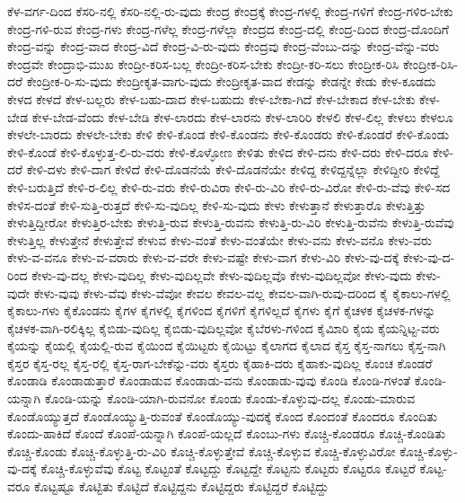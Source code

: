 {ಕೆಳ-ವರ್ಗ-ದಿಂದ
ಕೆಸರಿ-ನಲ್ಲಿ
ಕೆಸರಿ-ನಲ್ಲಿ-ರು-ವುದು
ಕೇಂದ್ರ
ಕೇಂದ್ರಕ್ಕೆ
ಕೇಂದ್ರ-ಗಳಲ್ಲಿ
ಕೇಂದ್ರ-ಗಳಿಗೆ
ಕೇಂದ್ರ-ಗಳಿರ-ಬೇಕು
ಕೇಂದ್ರ-ಗಳಿ-ರುವ
ಕೇಂದ್ರ-ಗಳು
ಕೇಂದ್ರ-ಗಳೆಲ್ಲ
ಕೇಂದ್ರ-ಗಳೆಲ್ಲಾ
ಕೇಂದ್ರದ
ಕೇಂದ್ರ-ದಲ್ಲಿ
ಕೇಂದ್ರ-ದಿಂದ
ಕೇಂದ್ರ-ದೊಂದಿಗೆ
ಕೇಂದ್ರ-ವನ್ನು
ಕೇಂದ್ರ-ವಾದ
ಕೇಂದ್ರ-ವಿದೆ
ಕೇಂದ್ರ-ವಿ-ರು-ವುದು
ಕೇಂದ್ರವು
ಕೇಂದ್ರ-ವೆಂಬು-ದನ್ನು
ಕೇಂದ್ರ-ವೆನ್ನು-ವರು
ಕೇಂದ್ರವೇ
ಕೇಂದ್ರಾಭಿ-ಮುಖ
ಕೇಂದ್ರೀ-ಕರಿಸ-ಬಲ್ಲ
ಕೇಂದ್ರೀ-ಕರಿಸ-ಬೇಕು
ಕೇಂದ್ರೀ-ಕರಿ-ಸಲು
ಕೇಂದ್ರೀಕ-ರಿಸಿ
ಕೇಂದ್ರೀಕ-ರಿಸಿ-ದರೆ
ಕೇಂದ್ರೀಕ-ರಿ-ಸು-ವುದು
ಕೇಂದ್ರೀಕೃತ-ವಾಗು-ವುದು
ಕೇಂದ್ರೀಕೃತ-ವಾದ
ಕೇಡನ್ನು
ಕೇಡನ್ನೇ
ಕೇಡು
ಕೇಳ-ಕೂಡದು
ಕೇಳದ
ಕೇಳದೆ
ಕೇಳ-ಬಲ್ಲರು
ಕೇಳ-ಬಹು-ದಾದ
ಕೇಳ-ಬಹುದು
ಕೇಳ-ಬೇಕಾ-ಗಿದೆ
ಕೇಳ-ಬೇಕಾದ
ಕೇಳ-ಬೇಕು
ಕೇಳ-ಬೇಡ
ಕೇಳ-ಬೇಡ-ವೆಂದು
ಕೇಳ-ಬೇಡಿ
ಕೇಳ-ಲಾರದು
ಕೇಳ-ಲಾರನು
ಕೇಳ-ಲಾರಿರಿ
ಕೇಳಲಿ
ಕೇಳ-ಲಿಲ್ಲ
ಕೇಳಲು
ಕೇಳಲೂ
ಕೇಳಲೇ-ಬಾರದು
ಕೇಳಲೇ-ಬೇಕು
ಕೇಳಿ
ಕೇಳಿ-ಕೊಂಡ
ಕೇಳಿ-ಕೊಂಡನು
ಕೇಳಿ-ಕೊಂಡರು
ಕೇಳಿ-ಕೊಂಡರೆ
ಕೇಳಿ-ಕೊಂಡು
ಕೇಳಿ-ಕೊಂಡೆ
ಕೇಳಿ-ಕೊಳ್ಳುತ್ತ-ಲಿ-ರು-ವರು
ಕೇಳಿ-ಕೊಳ್ಳೋಣ
ಕೇಳಿತು
ಕೇಳಿದ
ಕೇಳಿ-ದನು
ಕೇಳಿ-ದರು
ಕೇಳಿ-ದರೂ
ಕೇಳಿ-ದರೆ
ಕೇಳಿ-ದಳು
ಕೇಳಿ-ದಾಗ
ಕೇಳಿದೆ
ಕೇಳಿ-ದೊಡನೆಯೆ
ಕೇಳಿ-ದೊಡನೆಯೇ
ಕೇಳಿದ್ದ
ಕೇಳಿದ್ದನ್ನೆಲ್ಲಾ
ಕೇಳಿದ್ದೀರಿ
ಕೇಳಿದ್ದೆ
ಕೇಳಿ-ಬರುತ್ತಿದೆ
ಕೇಳಿ-ರ-ಲಿಲ್ಲ
ಕೇಳಿ-ರು-ವರು
ಕೇಳಿ-ರುವಿರಾ
ಕೇಳಿ-ರು-ವಿರಿ
ಕೇಳಿ-ರು-ವಿರೋ
ಕೇಳಿ-ರು-ವೆವು
ಕೇಳಿ-ಸದ
ಕೇಳಿಸ-ದಂತೆ
ಕೇಳಿ-ಸುತ್ತಿ-ರುತ್ತದೆ
ಕೇಳಿ-ಸು-ವುದಿಲ್ಲ
ಕೇಳಿ-ಸು-ವುದು
ಕೇಳು
ಕೇಳುತ್ತಾನೆ
ಕೇಳುತ್ತಾರೊ
ಕೇಳುತ್ತಿತ್ತು
ಕೇಳುತ್ತಿದ್ದೀರೋ
ಕೇಳುತ್ತಿರ-ಬೇಕು
ಕೇಳುತ್ತಿ-ರುವ
ಕೇಳುತ್ತಿ-ರುವನು
ಕೇಳುತ್ತಿ-ರು-ವಿರಿ
ಕೇಳುತ್ತಿ-ರುವೆನು
ಕೇಳುತ್ತಿ-ರುವೆವು
ಕೇಳುತ್ತಿಲ್ಲ
ಕೇಳುತ್ತೇನೆ
ಕೇಳುತ್ತೇವೆ
ಕೇಳುವ
ಕೇಳು-ವಂತೆ
ಕೇಳು-ವಂತೆಯೇ
ಕೇಳು-ವನು
ಕೇಳು-ವನೊ
ಕೇಳು-ವರು
ಕೇಳು-ವ-ವನೂ
ಕೇಳು-ವ-ವರಾರು
ಕೇಳು-ವ-ವರೇ
ಕೇಳು-ವಷ್ಟೇ
ಕೇಳು-ವಾಗ
ಕೇಳು-ವಿರಿ
ಕೇಳು-ವು-ದಕ್ಕೆ
ಕೇಳು-ವು-ದ-ರಿಂದ
ಕೇಳು-ವು-ದಲ್ಲ
ಕೇಳು-ವುದಿಲ್ಲ
ಕೇಳು-ವುದಿಲ್ಲವೇ
ಕೇಳು-ವುದಿಲ್ಲವೊ
ಕೇಳು-ವುದಿಲ್ಲವೋ
ಕೇಳು-ವುದು
ಕೇಳು-ವುದೇ
ಕೇಳು-ವುವು
ಕೇಳು-ವೆವು
ಕೇಳು-ವೆವೋ
ಕೇವಲ
ಕೇವಲ-ವಲ್ಲ
ಕೇವಲ-ವಾಗಿ-ರುವು-ದರಿಂದ
ಕೈ
ಕೈಕಾಲು-ಗಳಲ್ಲಿ
ಕೈಕಾಲು-ಗಳು
ಕೈಕೊಂಡನು
ಕೈಗಳ
ಕೈಗಳಲ್ಲಿ
ಕೈಗಳಿಂದ
ಕೈಗಳಿಗೆ
ಕೈಗಳಿಲ್ಲದೆ
ಕೈಗಳು
ಕೈಗೆ
ಕೈಚಳಕ
ಕೈಚಳಕ-ಗಳನ್ನು
ಕೈಚಳಕ-ವಾಗಿ-ರಲಿಕ್ಕಿಲ್ಲ
ಕೈಬಿಡು-ವುದಿಲ್ಲ
ಕೈಬಿಡು-ವುದಿಲ್ಲವೋ
ಕೈಬೆರಳು-ಗಳಿಂದ
ಕೈಮಿಾರಿ
ಕೈಯ
ಕೈಯನ್ನಿಟ್ಟ-ವರು
ಕೈಯನ್ನು
ಕೈಯಲ್ಲಿ
ಕೈಯಲ್ಲಿ-ರುವ
ಕೈಯಿಂದ
ಕೈಯಿಟ್ಟರು
ಕೈಯಿಟ್ಟು
ಕೈಲಾಗದ
ಕೈಲಾದ
ಕೈಸ್ತ
ಕೈಸ್ತ-ನಾಗಲು
ಕೈಸ್ತ-ನಾಗಿ
ಕೈಸ್ತರ
ಕೈಸ್ತ-ರಲ್ಲ
ಕೈಸ್ತ-ರಲ್ಲಿ
ಕೈಸ್ತ-ರಾಗ-ಬೇಕೆನ್ನು-ವರು
ಕೈಸ್ತರು
ಕೈಹಾಕಿ-ದರು
ಕೈಹಾಕು-ವುದಿಲ್ಲ
ಕೊಂಚ
ಕೊಂಡರೆ
ಕೊಂಡಾಡಿ
ಕೊಂಡಾಡುತ್ತಾರೆ
ಕೊಂಡಾಡುವ
ಕೊಂಡಾಡು-ವನು
ಕೊಂಡಾಡು-ವುವು
ಕೊಂಡಿ
ಕೊಂಡಿ-ಗಳಂತೆ
ಕೊಂಡಿ-ಯನ್ನಾಗಿ
ಕೊಂಡಿ-ಯನ್ನು
ಕೊಂಡಿ-ಯಾಗಿ-ರುವನೋ
ಕೊಂಡು
ಕೊಂಡು-ಕೊಳ್ಳುವು-ದಲ್ಲ
ಕೊಂಡು-ಮಾರುವ
ಕೊಂಡೊಯ್ಯುತ್ತದೆ
ಕೊಂಡೊಯ್ಯುತ್ತಿ-ರುವಂತೆ
ಕೊಂಡೊಯ್ಯು-ವುದಕ್ಕೆ
ಕೊಂದ
ಕೊಂದಂತೆ
ಕೊಂದರೂ
ಕೊಂದಿತು
ಕೊಂದು-ಹಾಕಿದೆ
ಕೊಂದೆ
ಕೊಂಪೆ-ಯನ್ನಾಗಿ
ಕೊಂಪೆ-ಯಲ್ಲದೆ
ಕೊಂಬು-ಗಳು
ಕೊಚ್ಚಿ-ಕೊಂಡರೂ
ಕೊಚ್ಚಿ-ಕೊಂಡಿತು
ಕೊಚ್ಚಿ-ಕೊಂಡು
ಕೊಚ್ಚಿ-ಕೊಳ್ಳುತ್ತಿ-ರು-ವಿರಿ
ಕೊಚ್ಚಿ-ಕೊಳ್ಳುತ್ತೇವೆ
ಕೊಚ್ಚಿ-ಕೊಳ್ಳುವ
ಕೊಚ್ಚಿ-ಕೊಳ್ಳುವಿರೋ
ಕೊಚ್ಚಿ-ಕೊಳ್ಳು-ವು-ದಕ್ಕೆ
ಕೊಚ್ಚಿ-ಕೊಳ್ಳುವೆವು
ಕೊಟ್ಟ
ಕೊಟ್ಟಂತೆ
ಕೊಟ್ಟದ್ದು
ಕೊಟ್ಟದ್ದೇ
ಕೊಟ್ಟನು
ಕೊಟ್ಟರು
ಕೊಟ್ಟರೂ
ಕೊಟ್ಟರೆ
ಕೊಟ್ಟ-ವರೂ
ಕೊಟ್ಟಷ್ಟೂ
ಕೊಟ್ಟಿತು
ಕೊಟ್ಟಿದೆ
ಕೊಟ್ಟಿದ್ದನು
ಕೊಟ್ಟಿದ್ದರು
ಕೊಟ್ಟಿದ್ದರೆ
ಕೊಟ್ಟಿದ್ದು
}
